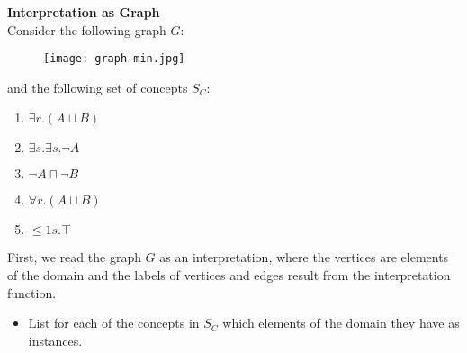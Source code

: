 \documentclass[12pt,a4paper]{article}
\newenvironment{problem}[2][{\color{red}Question}]{\begin{trivlist}
\item[\hskip \labelsep {\bfseries #1}\hskip \labelsep {\bfseries #2.}]}{\end{trivlist}}
\begin{document}
\begin{problem}{{\color{red}4}}
\textbf{Interpretation as Graph}\\
Consider the following graph $G$:
{\begin{figure}[ht]
    \centering
    \texttt{[image: graph-min.jpg]}
\end{figure}}
and the following set of concepts $S_{C}$:
\begin{enumerate}
    \item $\exists r.(A\sqcup B)$
    \item $\exists s.\exists s.\neg A$
    \item $\neg A\sqcap\neg B$
    \item $\forall r.(A\sqcup B)$
    \item $\leq{1}{s}.\top$
\end{enumerate}
First, we read the graph $G$ as an interpretation, where the vertices are elements of the domain and the labels of vertices and edges result from the interpretation function.
\begin{itemize}
    \item List for each of the concepts in $S_{C}$ which elements of the domain they have as instances.
\end{itemize}
\end{problem}
\end{document}
